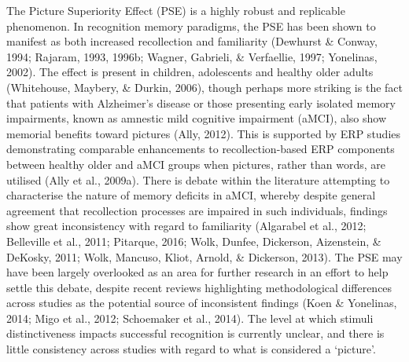 \documentclass[
  11pt,
]{article}
\begin{document}
The Picture Superiority Effect (PSE) is a highly robust and replicable
phenomenon. In recognition memory paradigms, the PSE has been shown to
manifest as both increased recollection and familiarity (Dewhurst \&
Conway, 1994; Rajaram, 1993, 1996b; Wagner, Gabrieli, \& Verfaellie,
1997; Yonelinas, 2002). The effect is present in children, adolescents
and healthy older adults (Whitehouse, Maybery, \& Durkin, 2006), though
perhaps more striking is the fact that patients with Alzheimer's disease
or those presenting early isolated memory impairments, known as amnestic
mild cognitive impairment (aMCI), also show memorial benefits toward
pictures (Ally, 2012). This is supported by ERP studies demonstrating
comparable enhancements to recollection-based ERP components between
healthy older and aMCI groups when pictures, rather than words, are
utilised (Ally et al., 2009a). There is debate within the literature
attempting to characterise the nature of memory deficits in aMCI,
whereby despite general agreement that recollection processes are
impaired in such individuals, findings show great inconsistency with
regard to familiarity (Algarabel et al., 2012; Belleville et al., 2011;
Pitarque, 2016; Wolk, Dunfee, Dickerson, Aizenstein, \& DeKosky, 2011;
Wolk, Mancuso, Kliot, Arnold, \& Dickerson, 2013). The PSE may have been
largely overlooked as an area for further research in an effort to help
settle this debate, despite recent reviews highlighting methodological
differences across studies as the potential source of inconsistent
findings (Koen \& Yonelinas, 2014; Migo et al., 2012; Schoemaker et al.,
2014). The level at which stimuli distinctiveness impacts successful
recognition is currently unclear, and there is little consistency across
studies with regard to what is considered a `picture'.
\end{document}
